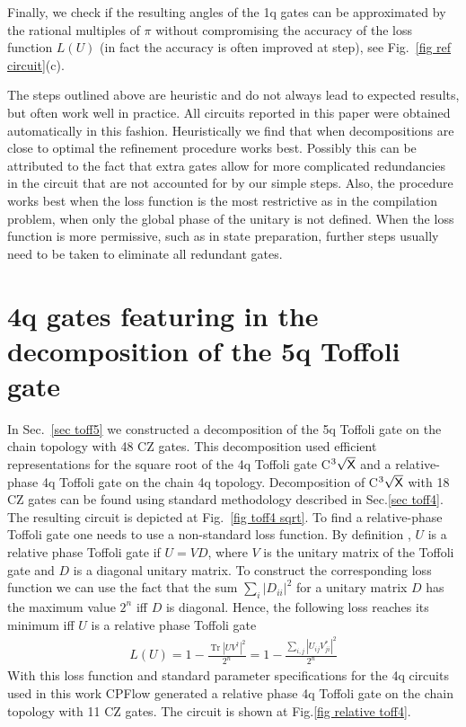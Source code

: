 \documentclass[twocolumn, amsfonts, amssymb, aps, nofootinbib]{revtex4-2}
\newcommand{\CZ}{\textsf{CZ }}
\newcommand{\package}[1]{\textrm {#1 }}
\newcommand{\cpflow}{\package{CPFlow}}
\begin{document}
Finally, we check if the resulting angles of the 1q gates can be approximated by the rational multiples of $\pi$ without compromising the accuracy of the loss function $L(U)$ (in fact the accuracy is often improved at step), see Fig.~\ref{fig ref circuit}(c).

The steps outlined above are heuristic and do not always lead to expected results, but often work well in practice. All circuits reported in this paper were obtained automatically in this fashion. Heuristically we find that when decompositions are close to optimal the refinement procedure works best. Possibly this can be attributed to the fact that extra gates allow for more complicated redundancies in the circuit that are not accounted for by our simple steps. Also, the procedure works best when the loss function is the most restrictive as in the compilation problem, when only the global phase of the unitary is not defined. When the loss function is more permissive, such as in state preparation, further steps usually need to be taken to eliminate all redundant gates.

\section{4q gates featuring in the decomposition of the 5q Toffoli gate \label{app 5q}}
In Sec.~\ref{sec toff5} we constructed a decomposition of the 5q Toffoli gate on the chain topology with 48 \CZ gates. This decomposition used efficient representations for the square root of the 4q Toffoli gate \textsf{C}${}^3\sqrt{\text{\textsf{X}}}$ and a relative-phase 4q Toffoli gate on the chain 4q topology. Decomposition of \textsf{C}${}^3\sqrt{\text{\textsf{X}}}$ with 18 \CZ gates can be found using standard methodology described in Sec.\ref{sec toff4}. The resulting circuit is depicted at Fig.~\ref{fig toff4 sqrt}. To find a relative-phase Toffoli gate one needs to use a non-standard loss function. By definition \cite{Maslov}, $U$ is a relative phase Toffoli gate if $U=VD$, where $V$ is the unitary matrix of the Toffoli gate and $D$ is a diagonal unitary matrix. To construct the corresponding loss function we can use the fact that the sum $\sum_i|D_{ii}|^2$ for a unitary matrix $D$ has the maximum value $2^n$ iff $D$ is diagonal. Hence, the following loss reaches its minimum iff $U$ is a relative phase Toffoli gate
\begin{align}
L(U)=1-\frac{\operatorname{Tr}\left|UV^\dagger\right|^2}{2^n}=1-\frac{\sum_{i, j}\left|U_{ij}V^*_{ji}\right|^2}{2^n}
\end{align}
With this loss function and standard parameter specifications for the 4q circuits used in this work \cpflow generated a relative phase 4q Toffoli gate on the chain topology with 11 \CZ gates. The circuit is shown at Fig.\ref{fig relative toff4}.


\end{document}
